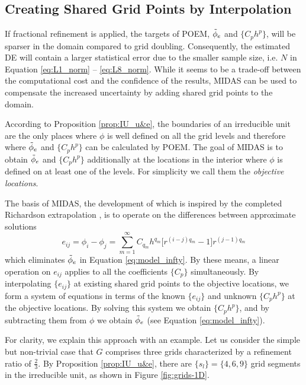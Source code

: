 
\subsection{Creating Shared Grid Points by Interpolation} \label{subsec:interp}
If fractional refinement is applied, the targets of POEM, $\Tilde{\phi}_{e}$ and $\{C_{p}h^p\}$, will be sparser in the domain compared to grid doubling. Consequently, the estimated DE will contain a larger statistical error due to the smaller sample size, i.e. $N$ in Equation \ref{eq:L1_norm} -- \ref{eq:L8_norm}. While it seems to be a trade-off between the computational cost and the confidence of the results, MIDAS can be used to compensate the increased uncertainty by adding shared grid points to the domain.

According to Proposition \ref{prop:IU_u&e}, the boundaries of an irreducible unit are the only places where $\phi$ is well defined on all the grid levels and therefore where $\Tilde{\phi}_e$ and $\{C_{p}h^p\}$ can be calculated by POEM. The goal of MIDAS is to obtain $\Tilde{\phi}_e$ and $\{C_{p}h^p\}$ additionally at the locations in the interior where $\phi$ is defined on at least one of the levels. For simplicity we call them the \textit{objective locations}.

The basis of MIDAS, the development of which is inspired by the completed Richardson extrapolation \citep{Roache1993,Richards1997}, is to operate on the differences between approximate solutions
\begin{equation} \label{eq:eij_infty}
    e_{ij} = \phi_i - \phi_j = \sum_{m=1}^{\infty} C_{q_m} h^{q_m} \big[ r^{(i-j)q_m} - 1 \big] r^{(j-1)q_m}
\end{equation}
which eliminates $\Tilde{\phi}_{e}$ in Equation \ref{eq:model_infty}. By these means, a linear operation on $e_{ij}$ applies to all the coefficients $\{C_p\}$ simultaneously. By interpolating $\{e_{ij}\}$ at existing shared grid points to the objective locations, we form a system of equations in terms of the known $\{e_{ij}\}$ and unknown $\{C_p h^p\}$ at the objective locations. By solving this system we obtain $\{C_p h^p\}$, and by subtracting them from $\phi$ we obtain $\Tilde{\phi}_{e}$ (see Equation \ref{eq:model_infty}).

For clarity, we explain this approach with an example. Let us consider the simple but non-trivial case that $G$ comprises three grids characterized by a refinement ratio of $\frac{2}{3}$. By Proposition \ref{prop:IU_u&e}, there are $\{s_l\}=\{4,6,9\}$ grid segments in the irreducible unit, as shown in Figure \ref{fig:grids-1D}.

